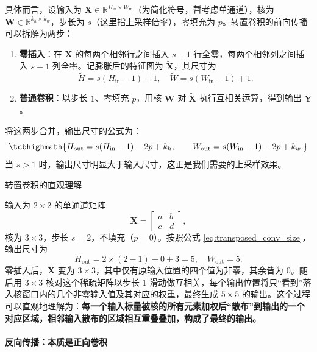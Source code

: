 具体而言，设输入为 $\mathbf{X}\in\mathbb{R}^{H_{\text{in}}\times W_{\text{in}}}$（为简化符号，暂考虑单通道），核为 $\mathbf{W}\in\mathbb{R}^{k_h\times k_w}$，步长为 $s$（这里指上采样倍率），零填充为 $p$。转置卷积的前向传播可以拆解为两步：
\begin{enumerate}
    \item \textbf{零插入}：在 $\mathbf{X}$ 的每两个相邻行之间插入 $s-1$ 行全零，每两个相邻列之间插入 $s-1$ 列全零。记膨胀后的特征图为 $\tilde{\mathbf{X}}$，其尺寸为
    \[
    \tilde{H} = s(H_{\text{in}}-1) + 1,\quad \tilde{W} = s(W_{\text{in}}-1) + 1.
    \]
    \item \textbf{普通卷积}：以步长 $1$、零填充 $p$，用核 $\mathbf{W}$ 对 $\tilde{\mathbf{X}}$ 执行互相关运算，得到输出 $\mathbf{Y}$。
\end{enumerate}
将这两步合并，输出尺寸的公式为：
\begin{equation}
    \tcbhighmath{
    H_{\text{out}} = s(H_{\text{in}}-1) - 2p + k_h,\qquad
    W_{\text{out}} = s(W_{\text{in}}-1) - 2p + k_w.} \label{eq:transposed_conv_size}
\end{equation}
当 $s>1$ 时，输出尺寸明显大于输入尺寸，这正是我们需要的上采样效果。

\begin{example}{转置卷积的直观理解}{}

输入为 $2\times2$ 的单通道矩阵
\[
\mathbf{X} = \begin{bmatrix}
a & b \\
c & d
\end{bmatrix},
\]
核为 $3\times3$，步长 $s=2$，不填充（$p=0$）。按照公式 \eqref{eq:transposed_conv_size}，输出尺寸为
\[
H_{\text{out}} = 2\times(2-1) - 0 + 3 = 5,\quad W_{\text{out}} = 5.
\]
零插入后，$\tilde{\mathbf{X}}$ 变为 $3\times3$，其中仅有原输入位置的四个值为非零，其余皆为 $0$。随后用 $3\times3$ 核对这个稀疏矩阵以步长 $1$ 滑动做互相关，每个输出位置将只“看到”落入核窗口内的几个非零输入值及其对应的权重，最终生成 $5\times5$ 的输出。这个过程可以直观地理解为：\textbf{每一个输入标量被核的所有元素加权后“散布”到输出的一个对应区域，相邻输入散布的区域相互重叠叠加，构成了最终的输出。}
\end{example}

\paragraph{反向传播：本质是正向卷积}


